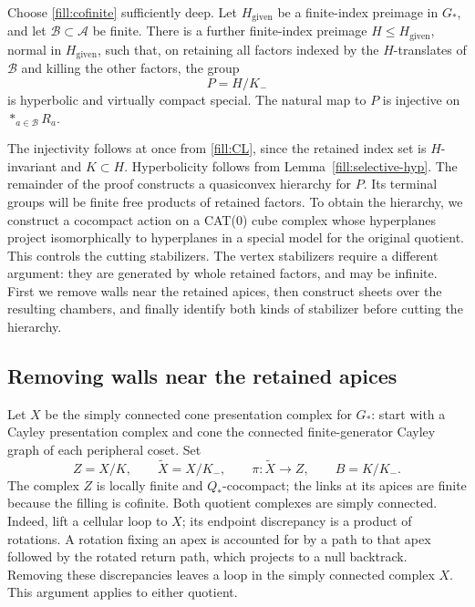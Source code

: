 \begin{proposition}\label{fill:selective}
Choose \eqref{fill:cofinite} sufficiently deep.  Let \(H_{\mathrm{given}}\)
be a finite-index preimage in \(G_*\), and let \(\mathcal B\subset\mathcal A\)
be finite.  There is a further finite-index preimage
\(H\le H_{\mathrm{given}}\), normal in \(H_{\mathrm{given}}\), such that,
on retaining all factors indexed by the \(H\)-translates of \(\mathcal B\)
and killing the other factors, the group
\begin{equation}
 P=H/K_-
 \label{fill:selective-quotient}
\end{equation}
is hyperbolic and virtually compact special.  The natural map to \(P\)
is injective on \(*_{a\in\mathcal B}R_a\).
\end{proposition}

The injectivity follows at once from \eqref{fill:CL}, since the retained
index set is \(H\)-invariant and \(K\subset H\).  Hyperbolicity follows from
Lemma~\ref{fill:selective-hyp}.  The remainder of the proof constructs a
quasiconvex hierarchy for \(P\).
Its terminal groups will be finite free products of retained factors.
To obtain the hierarchy, we construct a cocompact action on a CAT(0)
cube complex whose hyperplanes project isomorphically to hyperplanes
in a special model for the original quotient. This controls the cutting
stabilizers. The vertex stabilizers require a different argument: they
are generated by whole retained factors, and may be infinite. First we
remove walls near the retained apices, then construct sheets over the
resulting chambers, and finally identify both kinds of stabilizer before
cutting the hierarchy.

\subsection{Removing walls near the retained apices}

Let \(X\) be the simply connected cone presentation complex for \(G_*\):
start with a Cayley presentation complex and cone the connected
finite-generator Cayley graph of each peripheral coset.  Set
\begin{equation}
 Z=X/K,\qquad \widetilde X=X/K_-,
 \qquad \pi:\widetilde X\longrightarrow Z,\qquad B=K/K_-.
 \label{fill:branched}
\end{equation}
The complex \(Z\) is locally finite and \(Q_*\)-cocompact; the links at its
apices are finite because the filling is cofinite.  Both quotient
complexes are simply connected.  Indeed, lift a cellular loop to \(X\);
its endpoint discrepancy is a product of rotations.  A rotation fixing
an apex is accounted for by a path to that apex followed by the rotated
return path, which projects to a null backtrack.  Removing these
discrepancies leaves a loop in the simply connected complex \(X\).
This argument applies to either quotient.

